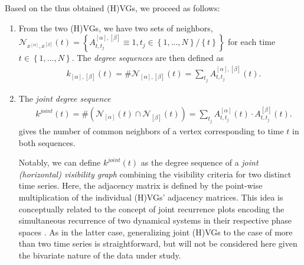 Based on the thus obtained (H)VGs, we proceed as follows:
\begin{enumerate}
\item From the two (H)VGs, we have two sets of neighbors, $\mathcal{N}_{x^{[\alpha]}, x^{[\beta]}}(t) = \left\{ A_{t, t_j}^{{[\alpha]}, {[\beta]}} \equiv 1, t_j \in \left\{1,\ldots, N \right\}/\left\{t\right\} \right\}$ for each time $t \in \left\{1,\ldots, N \right\}$. The \textit{degree sequences} are then defined as
\begin{align}
&k_{{[\alpha]}, {[\beta]}}(t) = \# \mathcal{N}_{{[\alpha]}, {[\beta]}}(t) = \sum_{t_j} A_{t,t_j}^{{[\alpha]}, {[\beta]}}(t).
\end{align}

\item The \textit{joint degree sequence}
\begin{align} \label{eq:jointK}
&k^{joint}(t) = \# \left( \mathcal{N}_{{[\alpha]}}(t) \cap \mathcal{N}_{{[\beta]}}(t) \right) = \sum_{t_j} A_{t,t_j}^{{[\alpha]}}(t)\cdot A_{t,t_j}^{{[\beta]}}(t).
\end{align}
gives the number of common neighbors of a vertex corresponding to time $t$ in both sequences.

Notably, we can define $k^{joint}(t)$ as the degree sequence of a \textit{joint (horizontal) visibility graph} combining the visibility criteria for two distinct time series. Here, the adjacency matrix is defined by the point-wise multiplication of the individual (H)VGs' adjacency matrices. This idea is conceptually related to the concept of joint recurrence plots encoding the simultaneous recurrence of two dynamical systems in their respective phase spaces \cite{romano2004}. As in the latter case, generalizing joint (H)VGs to the case of more than two time series is straightforward, but will not be considered here given the bivariate nature of the data under study.


\end{enumerate}

